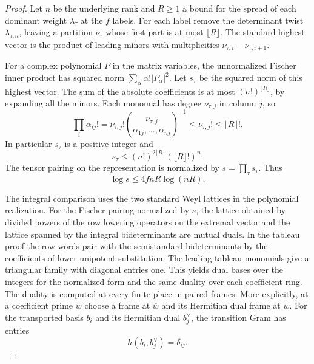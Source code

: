 \begin{proof}
Let \(n\) be the
underlying rank and \(R\ge1\) a bound for the spread of
each dominant weight \(\lambda_\tau\) at the \(f\) labels.
For each label remove the determinant twist
\(\lambda_{\tau,n}\), leaving a partition
\(\nu_\tau\) whose first part is at most \(\lfloor R\rfloor\).
The standard highest vector is the product of leading minors
with multiplicities \(\nu_{\tau,i}-\nu_{\tau,i+1}\).

For a complex polynomial \(P\) in the matrix variables,
the unnormalized Fischer inner product has squared norm
\(\sum_\alpha\alpha!|P_\alpha|^2\).
Let \(s_\tau\) be the squared norm of this highest vector.
The sum of the absolute coefficients is at most
\((n!)^{\lfloor R\rfloor}\), by expanding all the minors.
Each monomial has degree \(\nu_{\tau,j}\) in column \(j\),
so 
\[
 \prod_i\alpha_{ij}!=\nu_{\tau,j}!\binom{\nu_{\tau,j}}{\alpha_{1j},\ldots,\alpha_{nj}}^{-1}\le\nu_{\tau,j}!\le\lfloor R\rfloor!.
\]
In particular \(s_\tau\) is a positive integer and
\[
  s_\tau\le (n!)^{2\lfloor R\rfloor}
                            (\lfloor R\rfloor!)^n.
\]
The tensor pairing on the representation is normalized by
\(s=\prod_\tau s_\tau\). Thus
\[
                 \log s\le 4fnR\log(nR).
\]

The integral comparison uses the two standard Weyl lattices
in the polynomial realization. For the Fischer pairing
normalized by \(s\), the lattice obtained by divided powers
of the row lowering operators on the extremal vector and
the lattice spanned by the integral bideterminants are mutual
duals. In the tableau proof the row words pair with the
semistandard bideterminants by the coefficients of lower
unipotent substitution. The leading tableau monomials give
a triangular family with diagonal entries one. This yields
dual bases over the integers for the normalized form and the
same duality over each coefficient ring.
The duality is computed at every finite place in paired
frames. More explicitly, at a coefficient prime \(w\) choose
a frame at \(\overline w\) and its Hermitian dual frame at
\(w\). For the transported basis \(b_i\) and its Hermitian dual \(b_j^\vee\), the transition Gram has entries
\[
  h(b_i,b_j^\vee)=\delta_{ij}.
\]


\end{proof}
